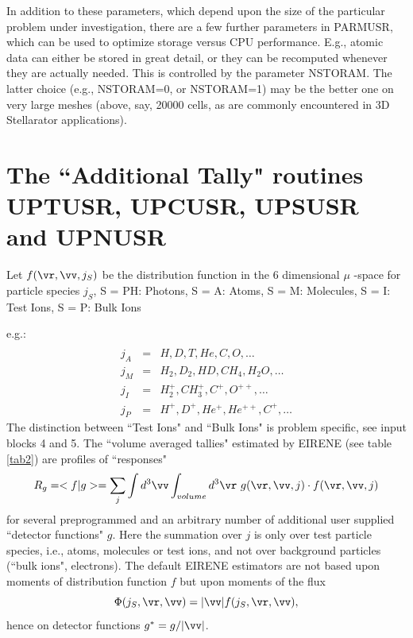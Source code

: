 In addition to these parameters, which depend upon the size of the
particular problem under investigation, there are a few further
parameters in PARMUSR, which can be used to optimize storage versus CPU
performance. E.g., atomic data can either be stored in great detail, or
they can be recomputed whenever they are actually needed. This is controlled
by the parameter NSTORAM.
The latter
choice (e.g., NSTORAM=0, or NSTORAM=1)
may be the better one on very large meshes (above, say, 20000
cells, as are commonly encountered in 3D Stellarator applications).

\newpage
\section{The ``Additional Tally" routines UPTUSR, UPCUSR, UPSUSR and UPNUSR}
\label{sec3.2}

Let $   f(\vr , \vv ,j_S)$ be the distribution function in the 6
dimensional $\mu$ -space for particle species $j_S$, S = PH:
Photons, S = A: Atoms, S = M: Molecules, S = I: Test Ions, S = P:
Bulk Ions

e.g.:
\begin{eqnarray}
& & \\ j_A    & =  & H  , D , T , He , C , O  ,  \dots \nonumber \\
j_M  &  = & H_2  , D_2,  HD , CH_4 , H_2 O ,  \dots \nonumber \\
j_I  &  = & H_2^+ , CH_3^+ ,  C^+ , O^{++} , \dots  \nonumber \\
j_P  &  = & H^+  , D^+ , He^+  ,  He^{++} , C^+ , \dots \nonumber
\end{eqnarray}
The distinction between ``Test Ions" and ``Bulk Ions" is problem specific,
see input blocks 4 and 5.
The ``volume averaged tallies" estimated by EIRENE (see table \ref{tab2})
are profiles of
``responses"
\[
R_g   =    <    f | g   >
=   \sum_{j}   \int d^3 \vv
\int_{volume} d^3 \vr \ g(\vr , \vv
, j)     \cdot     f(\vr , \vv , j)\label{est}
\]
for several preprogrammed and an arbitrary number of additional user
supplied ``detector functions" $g$. Here the summation over $j$ is only
over test particle species, i.e., atoms, molecules or test ions, and
not over background particles (``bulk ions", electrons). The default EIRENE
estimators are not based upon moments of distribution function $f$
but upon moments of the flux
\begin{displaymath}
\Phi ( j_S , \vr ,
\vv )   =   |
\vv |  f(j_S , \vr , \vv),
\end{displaymath}
hence
on detector functions $g^{*}  =   g / | \vv |
$.

